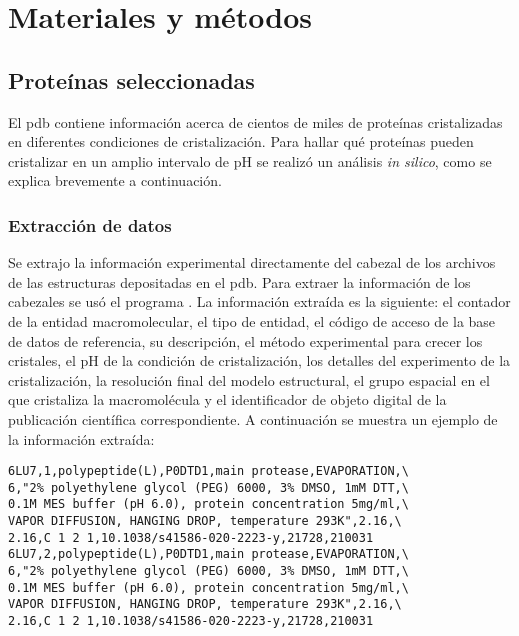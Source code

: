 \chapter{Materiales y métodos}

\section{Proteínas seleccionadas}
El \acrshort{pdb} contiene información acerca de cientos de miles de proteínas cristalizadas en diferentes condiciones de cristalización. Para hallar qué proteínas pueden cristalizar en un amplio intervalo de pH se realizó un análisis \emph{in silico}, como se explica brevemente a continuación. 

\subsection{Extracción de datos}
Se extrajo la información experimental directamente del cabezal de los archivos de las estructuras depositadas en el \acrshort{pdb}. Para extraer la información de los cabezales se usó el programa . La información extraída es la siguiente: el contador de la entidad macromolecular, el tipo de entidad, el código de acceso de la base de datos de referencia, su descripción, el método experimental para crecer los cristales, el pH de la condición de cristalización, los detalles del experimento de la cristalización, la resolución final del modelo estructural, el grupo espacial en el que cristaliza la macromolécula y el identificador de objeto digital de la publicación científica correspondiente. A continuación se muestra un ejemplo de la información extraída:

\begin{kaobox}[frametitle=Ejemplo 1]
\begin{verbatim}
6LU7,1,polypeptide(L),P0DTD1,main protease,EVAPORATION,\
6,"2% polyethylene glycol (PEG) 6000, 3% DMSO, 1mM DTT,\
0.1M MES buffer (pH 6.0), protein concentration 5mg/ml,\
VAPOR DIFFUSION, HANGING DROP, temperature 293K",2.16,\
2.16,C 1 2 1,10.1038/s41586-020-2223-y,21728,210031
6LU7,2,polypeptide(L),P0DTD1,main protease,EVAPORATION,\
6,"2% polyethylene glycol (PEG) 6000, 3% DMSO, 1mM DTT,\
0.1M MES buffer (pH 6.0), protein concentration 5mg/ml,\
VAPOR DIFFUSION, HANGING DROP, temperature 293K",2.16,\
2.16,C 1 2 1,10.1038/s41586-020-2223-y,21728,210031
\end{verbatim}
\end{kaobox}


